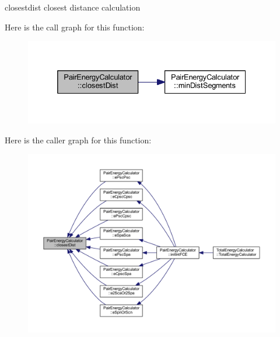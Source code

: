 closestdist closest distance calculation 



Here is the call graph for this function\+:\nopagebreak
\begin{figure}[H]
\begin{center}
\leavevmode
\includegraphics[width=332pt]{class_pair_energy_calculator_aeb01996df33c2833b4f549f615eab8eb_cgraph}
\end{center}
\end{figure}




Here is the caller graph for this function\+:\nopagebreak
\begin{figure}[H]
\begin{center}
\leavevmode
\includegraphics[width=350pt]{class_pair_energy_calculator_aeb01996df33c2833b4f549f615eab8eb_icgraph}
\end{center}
\end{figure}


